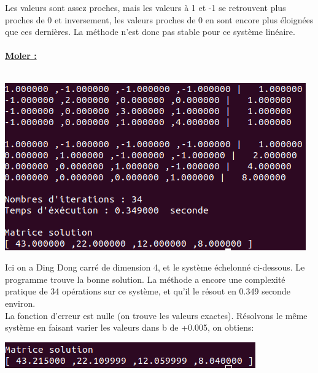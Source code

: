 \documentclass[a4paper]{article}
\begin{document}
Les valeurs sont assez proches, mais les valeurs à 1 et -1 se retrouvent plus proches de 0 et inversement, les valeurs proches de 0 en sont encore plus éloignées que ces dernières.
La méthode n'est donc pas stable pour ce système linéaire.
\\
\\
\textbf{\underline{\large{Moler :}}}
\\
\\
\begin{center}
	\includegraphics[scale=0.5]{./img/gauss/TestMoler.png} \\
\end{center}

Ici on a Ding Dong carré de dimension 4, et le système échelonné ci-dessous.
Le programme trouve la bonne solution.
La méthode a encore une complexité pratique de 34 opérations sur ce système, et qu'il le résout en 0.349 seconde environ.
\\
La fonction d'erreur est nulle (on trouve les valeurs exactes).
Résolvons le même système en faisant varier les valeurs dans b de +0.005, on obtiens:
\\
\begin{center}
	\includegraphics[scale=0.5]{./img/gauss/moler005.png} \\
\end{center}
\end{document}
